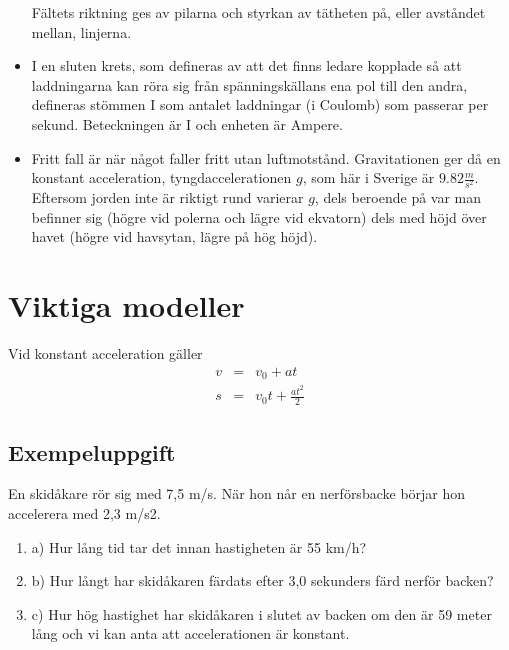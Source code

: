 \documentclass[11pt]{article}
\begin{document}
\begin{itemize}
        Fältets riktning ges av pilarna och styrkan av tätheten på, eller avståndet mellan, linjerna.
        \item I en sluten krets, som defineras av att det finns ledare kopplade så att laddningarna kan röra sig från spänningskällans ena pol till den andra, defineras stömmen I som antalet laddningar (i Coulomb) som passerar per sekund. Beteckningen är I och enheten är Ampere.
        \item Fritt fall är när något faller fritt utan luftmotstånd. Gravitationen ger då en konstant acceleration,
        tyngdaccelerationen $g$, som här i Sverige är $9.82 \frac{m}{s^2}$. Eftersom jorden inte är riktigt rund varierar $g$,
        dels beroende på var man befinner sig (högre vid polerna och lägre vid ekvatorn) dels med höjd över havet (högre vid
        havsytan, lägre på hög höjd).
    \end{itemize}
    \section{Viktiga modeller}
    Vid konstant acceleration gäller
    \begin{eqnarray}
        v&=&v_0+at \\
        s&=&v_0 t +  \frac{at^2}{2}
    \end{eqnarray}
    \subsection{Exempeluppgift}
    En skidåkare rör sig med 7,5 m/s. När hon når en
    nerförsbacke börjar hon accelerera med 2,3 m/s2.
    \begin{enumerate}
        \item{a)} Hur lång tid tar det innan hastigheten är 55 km/h?
        \item{b)} Hur långt har skidåkaren färdats efter 3,0
        sekunders färd nerför backen?
        \item{c)} Hur hög hastighet har skidåkaren i slutet av
        backen om den är 59 meter lång och vi kan anta att
        accelerationen är konstant.
    \end{enumerate}
\end{document}

